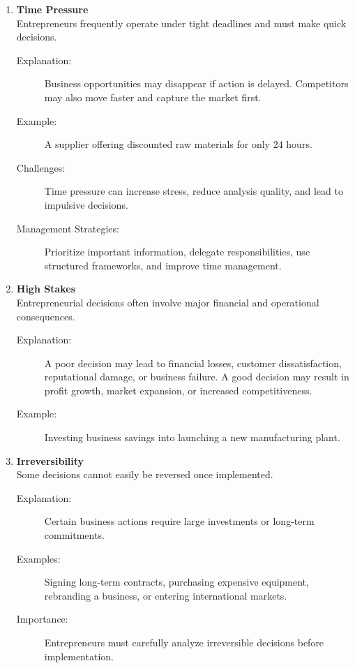 \documentclass[12pt,a4paper]{article}
\begin{document}
\begin{enumerate}
    \item \textbf{Time Pressure} \\
    Entrepreneurs frequently operate under tight deadlines and must make quick decisions.
    \begin{description}
        \item[Explanation:] Business opportunities may disappear if action is delayed. Competitors may also move faster and capture the market first.
        \item[Example:] A supplier offering discounted raw materials for only 24 hours.
        \item[Challenges:] Time pressure can increase stress, reduce analysis quality, and lead to impulsive decisions.
        \item[Management Strategies:] Prioritize important information, delegate responsibilities, use structured frameworks, and improve time management.
    \end{description}

    \item \textbf{High Stakes} \\
    Entrepreneurial decisions often involve major financial and operational consequences.
    \begin{description}
        \item[Explanation:] A poor decision may lead to financial losses, customer dissatisfaction, reputational damage, or business failure. A good decision may result in profit growth, market expansion, or increased competitiveness.
        \item[Example:] Investing business savings into launching a new manufacturing plant.
    \end{description}

    \item \textbf{Irreversibility} \\
    Some decisions cannot easily be reversed once implemented.
    \begin{description}
        \item[Explanation:] Certain business actions require large investments or long-term commitments.
        \item[Examples:] Signing long-term contracts, purchasing expensive equipment, rebranding a business, or entering international markets.
        \item[Importance:] Entrepreneurs must carefully analyze irreversible decisions before implementation.
    \end{description}
\end{enumerate}
\end{document}
